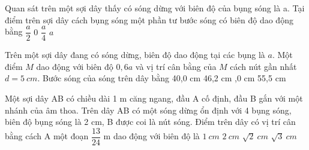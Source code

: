 \setcounter{ex}{0}
\setcounter{paragraph}{0}
\PhanI
{}
\begin{ex}
Quan sát trên một sợi dây thấy có sóng dừng với biên độ của bụng sóng là a. Tại điểm trên sợi dây cách bụng sóng một phần tư bước sóng có biên độ dao động bằng
\choice
{$\dfrac{a}{2}$}
{\True $0$}
{$\dfrac{a}{4}$}
{$a$}
\loigiai{}
\end{ex}
\begin{ex}%
Trên một sợi dây đang có sóng dừng, biên độ dao động tại các bụng là $a$.  Một điểm $M$ dao động với biên độ $0,6a$ và vị trí cân bằng của $M$ cách nút gần nhất $d=5\ cm$. Bước sóng của sóng trên dây bằng
\choice
{40,0 cm}
{46,2 cm}
{,0 cm}
{55,5 cm}
\end{ex}
\begin{ex}%
Một sợi dây AB có chiều dài 1 m căng ngang, đầu A cố định, đầu B gắn với một nhánh của âm thoa. Trên dây AB có một sóng dừng ổn định với 4 bụng sóng, biên độ bụng sóng là 2 cm, B được coi là nút sóng. Điểm trên dây có vị trí cân bằng cách A một đoạn $\dfrac{13}{24}$ m dao động với biên độ là
\choice
{\True $1\ cm$}
{$2\ cm$}
{$\sqrt{2}\ cm$}
{$\sqrt{3}\ cm$}
\end{ex} 
